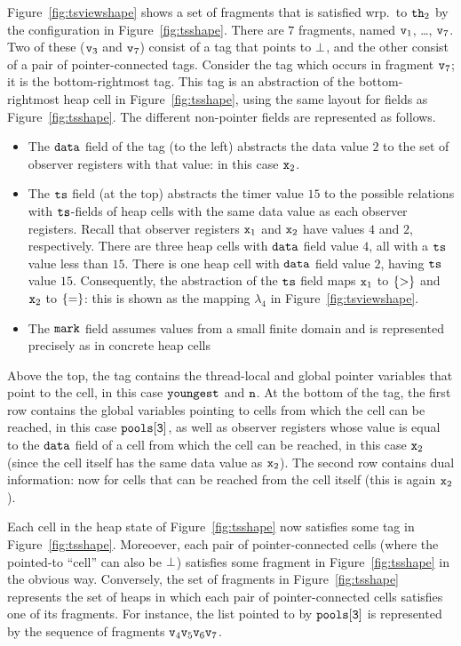Figure~\ref{fig:tsviewshape} shows a set of fragments that is
satisfied wrp.\ to ${\tt th}_2$ by the configuration in Figure~\ref{fig:tsshape}.
There are $7$ fragments, named $\mathtt{v}_1$, \ldots , $\mathtt{v}_7$. Two of
these ($\mathtt{v}_3$ and $\mathtt{v}_7$) consist of a tag that points to $\bot$,
and the other consist of a pair of pointer-connected tags.
Consider the tag which occurs in fragment $\mathtt{v}_7$; it is the bottom-rightmost
tag. This tag is an abstraction of the
bottom-rightmost heap cell in Figure~\ref{fig:tsshape}, using the same layout
for fields as Figure~\ref{fig:tsshape}. The different non-pointer fields
are represented as follows.
\begin{itemize}
\item The $\tt data$ field of the tag (to the left) abstracts the data value
  $2$ to the set of observer registers with that value: in this case
  $\mathtt{x}_2$.
\item The $\tt ts$ field (at the top) abstracts the timer value $15$ to
  the possible relations with $\tt ts$-fields of heap cells with the same
  data value as each observer registers. Recall that observer registers
  $\mathtt{x}_1$ and $\mathtt{x}_2$ have values $4$ and $2$, respectively. There are
  three heap cells with $\tt data$ field value $4$, all with a $\tt ts$
  value less than $15$. There is one heap cell with
  $\tt data$ field value $2$, having $\tt ts$ value $15$.
  Consequently, the abstraction of the $\tt ts$ field maps $\mathtt{x}_1$ to
  $\left\{>\right\}$ and $\mathtt{x}_2$ to $\left\{=\right\}$: this is shown as the mapping
  $\lambda_4$ in Figure~\ref{fig:tsviewshape}.
\item The $\tt mark$ field assumes values from a small finite domain and
  is represented precisely as in concrete heap cells
\end{itemize}
Above the top, the tag contains the thread-local and global pointer variables
that point to the cell, in this case $\tt youngest$ and $\tt n$.
At the bottom of the tag, the first row contains the global variables 
pointing to cells from which the cell can be reached, in this case
$\tt pools[3]$, as well as observer registers whose value is equal to the
${\tt data}$ field of a cell from which  the cell can be reached, in this
case $\mathtt{x}_2$ (since the cell itself has the same data value as $\mathtt{x}_2$).
The second row contains dual information: now for cells that can be reached
from the cell itself (this is again $\mathtt{x}_2$).


Each cell in the heap state of Figure~\ref{fig:tsshape} now satisfies
some tag in Figure~\ref{fig:tsshape}. Moreoever, each pair of pointer-connected
cells (where the pointed-to ``cell'' can also be $\bot$)
satisfies some fragment in Figure~\ref{fig:tsshape} in the obvious way.
Conversely, the set of fragments in
Figure~\ref{fig:tsshape} represents the set of heaps in which each pair of
pointer-connected cells satisfies one of its fragments. For instance, the
list pointed to by $\tt pools[3]$ is represented by the sequence of
fragments $\mathtt{v}_4 \mathtt{v}_5 \mathtt{v}_6 \mathtt{v}_7$.

